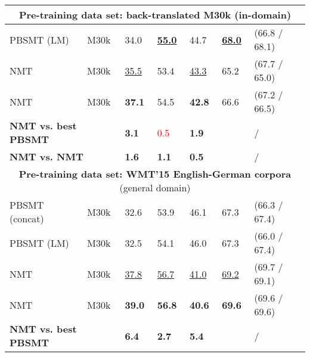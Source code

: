 \documentclass[11pt]{article}
\newcommand{\red}[1]{\textcolor{Red}{#1}}
\newcommand{\redbf}[1]{\textbf{\textcolor{Red}{#1}}}
\newcommand{\green}[1]{\textcolor{OliveGreen}{#1}}
\newcommand{\greenbf}[1]{\textbf{\textcolor{OliveGreen}{#1}}}
\newcommand{\whitebf}[1]{\textbf{\textcolor{White}{#1}}}
\begin{document}
\begin{table*}[t!]
{\begin{tabular}{lllllll}
    \multicolumn{7}{c}{\textbf{Pre-training data set: back-translated M30k} (in-domain)}\\
    \midrule
     


PBSMT (LM) &
    M30k &
    34.0 {\small \whitebf{}} &
    \textbf{\underline{55.0}} {\small \whitebf{}} &
    44.7 {\small \whitebf{}} &
    \textbf{\underline{68.0}} &
    (66.8 / 68.1) \\


NMT &
    M30k &
    \underline{35.5} {\small \whitebf{}} &
    53.4 {\small \whitebf{}} &
    \underline{43.3} {\small \whitebf{}} &
    65.2 &
    (67.7 / 65.0) \\


NMT &
    M30k &
    \textbf{37.1} &
    54.5\whitebf{} &
    \textbf{42.8} &
    66.6 &
    (67.2 / 66.5) \\
\midrule
    
    \multicolumn{2}{l}{\textbf{NMT vs. best PBSMT}} &
    \greenbf{ 3.1} &
    \red{ 0.5} &
    \greenbf{ 1.9} &
    \redbf{} & 
    \greenbf{} / \red{} \\
    
    \multicolumn{2}{l}{\textbf{NMT vs. NMT}} &
    \greenbf{ 1.6} &
    \greenbf{ 1.1} &
    \greenbf{ 0.5} &
    \greenbf{} &
    \red{} / \green{} \\
    
    \midrule
    \multicolumn{7}{c}{\textbf{Pre-training data set: WMT'15 English-German corpora} (general domain)}\\
    \midrule
    
PBSMT (concat) &
    M30k &
    32.6 &
    53.9 &
    46.1 &
    67.3 &
    (66.3 / 67.4) \\


PBSMT (LM) &
    M30k &
    32.5 &
    54.1 &
    46.0 &
    67.3 &
    (66.0 / 67.4) \\


NMT &
    M30k &
    \underline{37.8}\whitebf{} {\small\whitebf{}} &
    \underline{56.7}\whitebf{} {\small\whitebf{}} &
    \underline{41.0}\whitebf{} {\small\whitebf{}} &
    \underline{69.2} &
    (69.7 / 69.1) \\


NMT &
    M30k &
    \textbf{39.0} &
    \textbf{56.8}\whitebf{} &
    \textbf{40.6}\whitebf{} &
    \textbf{69.6} &
    (69.6 / 69.6) \\
\midrule
    
    \multicolumn{2}{l}{\textbf{NMT vs. best PBSMT}} &
    \greenbf{ 6.4} &
    \greenbf{ 2.7} &
    \greenbf{ 5.4} &
    \greenbf{} &
    \greenbf{} / \green{} \\
    

\end{tabular}}
\end{table*}
\end{document}
